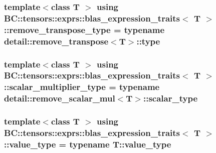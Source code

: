 \subsubsection[{\texorpdfstring{remove\+\_\+transpose\+\_\+type}{remove_transpose_type}}]{\setlength{\rightskip}{0pt plus 5cm}template$<$class T $>$ using {\bf B\+C\+::tensors\+::exprs\+::blas\+\_\+expression\+\_\+traits}$<$ T $>$\+::{\bf remove\+\_\+transpose\+\_\+type} =  typename {\bf detail\+::remove\+\_\+transpose}$<$T$>$\+::type}\hypertarget{structBC_1_1tensors_1_1exprs_1_1blas__expression__traits_a527a7e3e800aef6cbaedd8eba5f9ae06}{}\label{structBC_1_1tensors_1_1exprs_1_1blas__expression__traits_a527a7e3e800aef6cbaedd8eba5f9ae06}
\subsubsection[{\texorpdfstring{scalar\+\_\+multiplier\+\_\+type}{scalar_multiplier_type}}]{\setlength{\rightskip}{0pt plus 5cm}template$<$class T $>$ using {\bf B\+C\+::tensors\+::exprs\+::blas\+\_\+expression\+\_\+traits}$<$ T $>$\+::{\bf scalar\+\_\+multiplier\+\_\+type} =  typename {\bf detail\+::remove\+\_\+scalar\+\_\+mul}$<$T$>$\+::scalar\+\_\+type}\hypertarget{structBC_1_1tensors_1_1exprs_1_1blas__expression__traits_a786eb89c83fea25c296159067d6c1de2}{}\label{structBC_1_1tensors_1_1exprs_1_1blas__expression__traits_a786eb89c83fea25c296159067d6c1de2}
\subsubsection[{\texorpdfstring{value\+\_\+type}{value_type}}]{\setlength{\rightskip}{0pt plus 5cm}template$<$class T $>$ using {\bf B\+C\+::tensors\+::exprs\+::blas\+\_\+expression\+\_\+traits}$<$ T $>$\+::{\bf value\+\_\+type} =  typename T\+::value\+\_\+type}\hypertarget{structBC_1_1tensors_1_1exprs_1_1blas__expression__traits_ab83e4462629a63d1058ea86bee5c174b}{}\label{structBC_1_1tensors_1_1exprs_1_1blas__expression__traits_ab83e4462629a63d1058ea86bee5c174b}


